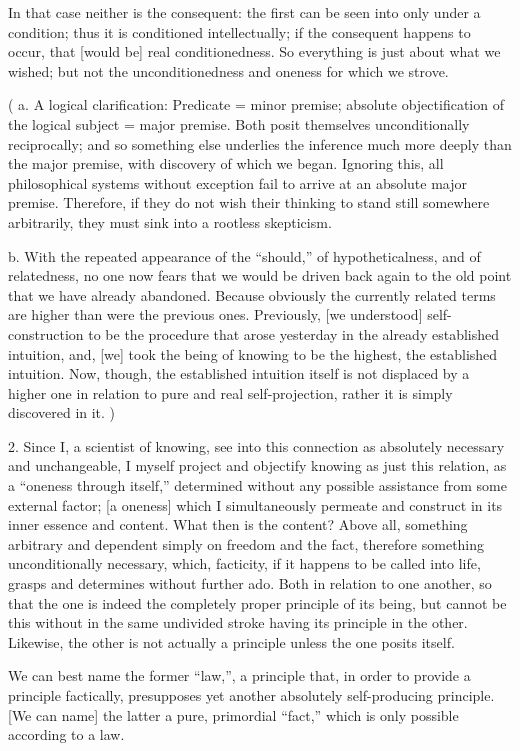 In that case neither is the consequent:
the first can be seen into only under a condition;
thus it is conditioned intellectually;
if the consequent happens to occur,
that [would be] real conditionedness.
So everything is just about what we wished;
but not the unconditionedness and oneness for which we strove.

(
a. A logical clarification:
Predicate = minor premise;
absolute objectification of the logical subject = major premise.
Both posit themselves unconditionally reciprocally;
and so something else underlies the inference
much more deeply than the major premise,
with discovery of which we began.
Ignoring this, all philosophical systems without exception
fail to arrive at an absolute major premise.
Therefore, if they do not wish their thinking
to stand still somewhere arbitrarily,
they must sink into a rootless skepticism.

b. With the repeated appearance of the “should,”
of hypotheticalness, and of relatedness,
no one now fears that we would be driven back again
to the old point that we have already abandoned.
Because obviously the currently related terms are
higher than were the previous ones.
Previously, [we understood] self-construction to be
the procedure that arose yesterday
in the already established intuition,
and, [we] took the being of knowing
to be the highest, the established intuition.
Now, though, the established intuition itself is not
displaced by a higher one in relation to
pure and real self-projection,
rather it is simply discovered in it.
)

2. Since I, a scientist of knowing,
see into this connection as
absolutely necessary and unchangeable,
I myself project and objectify knowing
as just this relation,
as a “oneness through itself,”
determined without any possible assistance
from some external factor;
[a oneness] which I simultaneously permeate
and construct in its inner essence and content.
What then is the content?
Above all, something arbitrary and
dependent simply on freedom and the fact,
therefore something unconditionally necessary,
which, facticity, if it happens to be called into life,
grasps and determines without further ado.
Both in relation to one another,
so that the one is indeed the completely
proper principle of its being,
but cannot be this without in the same undivided
stroke having its principle in the other.
Likewise, the other is not actually a
principle unless the one posits itself.

We can best name the former “law,”,
a principle that, in order to provide a principle factically,
presupposes yet another absolutely self-producing principle.
[We can name] the latter a pure, primordial “fact,”
which is only possible according to a law.

